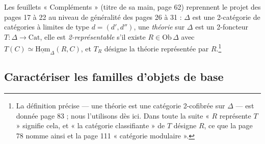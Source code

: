 \documentclass[11pt,a4paper]{article}
\begin{document}
Les feuillets « Compléments » (titre de sa main, page 62) reprennent le
projet des pages 17 à 22 au niveau de généralité des pages 26 à 31 : $\Delta$
est une 2-catégorie de catégories à limites de type $d = (d', d'')$, une
\emph{théorie} sur $\Delta$ est un 2-foncteur $T : \Delta \to \mathrm{Cat}$,
elle est \emph{2-représentable} s'il existe $R \in \mathrm{Ob}\,\Delta$ avec
$T(C) \simeq \underline{\mathrm{Hom}}_{\Delta}(R, C)$, et $T_{R}$ désigne la
théorie représentée par $R$.\footnote{La définition précise — une théorie
est une catégorie 2-cofibrée sur $\Delta$ — est donnée page 83 ; nous
l'utilisons dès ici. Dans toute la suite « $R$ représente $T$ » signifie
cela, et « la catégorie classifiante » de $T$ désigne $R$, ce que la page
78 nomme ainsi et la page 111 « catégorie modulaire ».}

\subsection*{Caractériser les familles d'objets de base}
\end{document}
